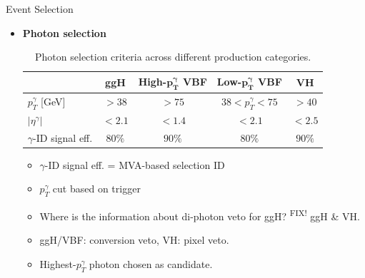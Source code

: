 \documentclass[9pt,aspectratio=1610]{beamer}
\newcommand{\khl}[1]{\textbf{\color{structure}#1}}
\newcommand{\ktodo}[1]{\colorbox{yellow!30}{{\color{red}\textsuperscript{\tiny FIX! }}#1}}
\begin{document}
\begin{frame}{Event Selection}
	\begin{itemize}
		\item \khl{Photon selection}
		\vspace{1em}
		\begin{table}[!ht]
			\centering
			\small
			\begin{tabular}{|l|c|c|c|c|}
				\hline
				& \multicolumn{1}{C{8em}}{\textbf{ggH}} & \multicolumn{1}{C{8em}}{\textbf{High-\(\mathbf{p^\gamma_T}\) VBF}} & \multicolumn{1}{C{8em}}{\textbf{Low-\(\mathbf{p^\gamma_T}\) VBF}} &  \multicolumn{1}{C{8em}|}{\textbf{VH}} \\
				\hline
				\(p^\gamma_T\) [GeV] & \multicolumn{1}{C{8em}}{\(> 38\)} & \multicolumn{1}{C{8em}}{\(> 75\)} & \multicolumn{1}{C{8em}}{\(38 < p^\gamma_T < 75\)} & \multicolumn{1}{C{8em}|}{\(> 40\)}\\
				\(|\eta^\gamma|\) & \multicolumn{1}{C{8em}}{\(< 2.1\)} & \multicolumn{1}{C{8em}}{\(< 1.4\)} & \multicolumn{1}{C{8em}}{\(< 2.1\)} & \multicolumn{1}{C{8em}|}{\(< 2.5\)}\\
				\(\gamma\)-ID signal eff. & \multicolumn{1}{C{8em}}{\(80\%\)} & \multicolumn{1}{C{8em}}{\(90\%\)} & \multicolumn{1}{C{8em}}{\(80\%\)} & \multicolumn{1}{C{8em}|}{\(90\%\)}\\
				\hline
			\end{tabular}
			\caption{Photon selection criteria across different production categories.}
		\end{table}
		\begin{itemize}
			\item \(\gamma\)-ID signal eff. = MVA-based selection ID \cite{photon_mvaid}
			\item \(p^\gamma_T\) cut based on trigger
			\item {\color{red}Where is the information about di-photon veto for ggH?} \ktodo{ggH \& VH}.
			\item ggH/VBF: conversion veto, VH: pixel veto.
			\item Highest-\(p^\gamma_T\) photon chosen as candidate.
		\end{itemize}
	\end{itemize}
\end{frame}
\end{document}
